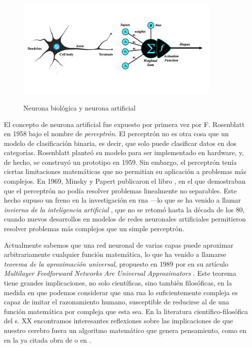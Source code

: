 \begin{figure}[H]
    \caption[Neurona biológica y neurona artificial]{Neurona biológica y neurona artificial}
    \centering
    \includegraphics[width=0.9\textwidth]{./figuras/perceptron_with_neuron.png}
    \label{fig:neurona_artificial_natural}
\end{figure}

El concepto de neurona artificial fue expuesto por primera vez por F. Rosenblatt en 1958 \citep{rothmanTransformersNaturalLanguage2021} bajo el nombre de \emph{perceptrón}. El perceptrón no es otra cosa que un modelo de clasificación binaria, es decir, que solo puede clasificar datos en dos categorías. Rosenblatt planteó su modelo para ser implementado en hardware, y, de hecho, se construyó un prototipo en 1959. Sin embargo, el perceptrón tenía ciertas limitaciones matemáticas que no permitían su aplicación a problemas más complejos. En 1969, Minsky y Papert publicaron el libro \citep{minsky1969perceptrons}, en el que demostraban que el perceptrón no podía resolver problemas linealmente no separables. Este hecho supuso un freno en la investigación en \gls{rna} ---lo que se ha venido a llamar \emph{invierno de la inteligencia artificial} \citep{InviernoIA2023}, que no se retomó hasta la década de los 80, cuando nuevos desarrollos en modelos de redes neuronales artificiales permitieron resolver problemas más complejos que un simple perceptrón. 

Actualmente sabemos que una red neuronal de varias capas puede aproximar arbitrariamente cualquier función matemática, lo que ha venido a llamarse \emph{teorema de la aproximación universal}, propuesto en 1989 por \citeauthor{hornikMultilayerFeedforwardNetworks1989} en su artículo \emph{Multilayer Feedforward Networks Are Universal Approximators} \citep{hornikMultilayerFeedforwardNetworks1989}. Este teorema tiene grandes implicaciones, no solo científicas, sino también filosóficas, en la medida en que podemos considerar que una \gls{rna} lo suficientemente compleja es capaz de imitar el razonamiento humano, susceptible de reducirse al de una función matemática por compleja que esta sea. En la literatura científico-filosófica del s. XX encontramos interesantes reflexiones sobre las implicaciones de que nuestro cerebro fuera un algoritmo matemático que genera pensamiento, como en en la ya citada obra de \cite{penroseNuevaMenteEmperador2015} o en \cite{searleMentesCerebrosCiencia1985}.


